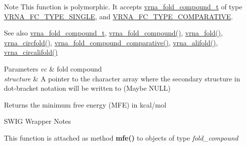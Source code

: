 \begin{DoxyNote}{Note}
This function is polymorphic. It accepts \mbox{\hyperlink{group__fold__compound_ga1b0cef17fd40466cef5968eaeeff6166}{vrna\+\_\+fold\+\_\+compound\+\_\+t}} of type \mbox{\hyperlink{group__fold__compound_gga01a4ff86fa71deaaa5d1abbd95a1447da7e264dd3cf2dc9b6448caabcb7763cd6}{V\+R\+N\+A\+\_\+\+F\+C\+\_\+\+T\+Y\+P\+E\+\_\+\+S\+I\+N\+G\+LE}}, and \mbox{\hyperlink{group__fold__compound_gga01a4ff86fa71deaaa5d1abbd95a1447dab821ce46ea3cf665be97df22a76f5023}{V\+R\+N\+A\+\_\+\+F\+C\+\_\+\+T\+Y\+P\+E\+\_\+\+C\+O\+M\+P\+A\+R\+A\+T\+I\+VE}}.
\end{DoxyNote}
\begin{DoxySeeAlso}{See also}
\mbox{\hyperlink{group__fold__compound_ga1b0cef17fd40466cef5968eaeeff6166}{vrna\+\_\+fold\+\_\+compound\+\_\+t}}, \mbox{\hyperlink{group__fold__compound_ga6601d994ba32b11511b36f68b08403be}{vrna\+\_\+fold\+\_\+compound()}}, \mbox{\hyperlink{group__mfe__fold__single_ga29a33b2895f4e67b0480271ff289afdc}{vrna\+\_\+fold()}}, \mbox{\hyperlink{group__mfe__fold__single_gaf973483d8acbc8cc9aacfc8a9b7f0074}{vrna\+\_\+circfold()}}, \mbox{\hyperlink{group__fold__compound_gad6bacc816af274922b13d947f708aa0c}{vrna\+\_\+fold\+\_\+compound\+\_\+comparative()}}, \mbox{\hyperlink{group__consensus__mfe__fold_ga6c9d3bef3e92c6d423ffac9f981418c1}{vrna\+\_\+alifold()}}, \mbox{\hyperlink{group__consensus__mfe__fold_ga17a1be7490468c29c335ba9bffacba53}{vrna\+\_\+circalifold()}}
\end{DoxySeeAlso}

\begin{DoxyParams}{Parameters}
{\em vc} & fold compound \\
\hline
{\em structure} & A pointer to the character array where the secondary structure in dot-\/bracket notation will be written to (Maybe N\+U\+LL)\\
\hline
\end{DoxyParams}
\begin{DoxyReturn}{Returns}
the minimum free energy (M\+FE) in kcal/mol
\end{DoxyReturn}
\begin{DoxyRefDesc}{S\+W\+I\+G Wrapper Notes}
\item[\mbox{\hyperlink{wrappers__wrappers000074}{S\+W\+I\+G Wrapper Notes}}]This function is attached as method {\bfseries mfe()} to objects of type {\itshape fold\+\_\+compound} \end{DoxyRefDesc}
